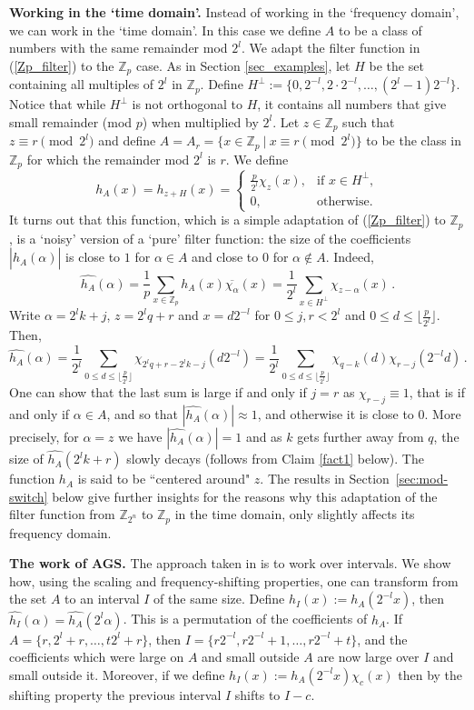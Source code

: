 \documentclass[11pt]{article}
\theoremstyle{definition}
\newcommand{\Z}{\mathbb{Z}}
\begin{document}
\noindent \textbf{Working in the `time domain'.} Instead of working in the `frequency domain', we can work in the `time domain'. In this case we define $A$ to be a class of numbers with the same remainder mod $2^l$. We adapt the filter function in (\ref{Zp_filter}) to the $\Z_p$ case. As in Section \ref{sec_examples}, let $H$ be the set containing all multiples of $2^l$ in $\Z_p$. Define $H^\perp := \{0, 2^{-l}, 2 \cdot 2^{-l}, \dots, (2^l-1) 2^{-l} \}$. Notice that while $H^\perp$ is not orthogonal to $H$, it contains all numbers that give small remainder (mod $p$) when multiplied by $2^l$. Let $z \in \Z_p$ such that $z \equiv r \pmod{2^l}$ and define $A=A_r = \{x \in \Z_p \ | \ x \equiv r \pmod{2^l} \}$ to be the class in $\Z_p$ for which the remainder mod $2^l$ is $r$. We define
\[ h_{A}(x) = h_{z+H}(x) = \begin{cases} \frac{p}{2^l} \chi_{z}(x), & \text{if }x\in H^\perp, \\ 0, &\text{otherwise.}\end{cases} \]
It turns out that this function, which is a simple adaptation of (\ref{Zp_filter}) to $\Z_p$, is a `noisy' version of a `pure' filter function: the size of the coefficients $|\widehat{h_{A}}(\alpha)|$ is close to $1$ for $\alpha \in A$ and close to $0$ for $\alpha \notin A$. Indeed,
\[ \widehat{h_A}(\alpha) = \frac{1}{p} \sum_{x \in \Z_p} h_A(x) \overline{\chi_{\alpha}}(x) = \frac{1}{2^l} \sum_{x \in H^\perp} \chi_{z-\alpha}(x) \, .\]
Write $\alpha = 2^lk+j$, $z = 2^lq+r$ and $x = d 2^{-l}$ for $0 \leq j,r < 2^l$ and $0 \leq d \leq \lfloor \frac{p}{2^l} \rfloor$. Then,
\[ \widehat{h_A}(\alpha) = \frac{1}{2^l} \sum_{0 \leq d \leq \lfloor \frac{p}{2^l} \rfloor} \chi_{2^lq+r-2^lk-j}(d 2^{-l}) = \frac{1}{2^l} \sum_{0 \leq d \leq \lfloor \frac{p}{2^l} \rfloor} \chi_{q-k}(d) \chi_{r-j}(2^{-l}d) \, .\]
One can show that the last sum is large if and only if $j=r$ as $\chi_{r-j} \equiv 1$, that is if and only if $\alpha \in A$, and so that $|\widehat{h_A}(\alpha)| \approx 1$, and otherwise it is close to $0$. More precisely, for $\alpha = z$ we have $|\widehat{h_A}(\alpha)| = 1$ and as $k$ gets further away from $q$, the size of $\widehat{h_A}(2^lk+r)$ slowly decays (follows from Claim \ref{fact1} below). The function $h_A$ is said to be ``centered around" $z$. The results in Section~\ref{sec:mod-switch} below give further insights for the reasons why this adaptation of the filter function from $\Z_{2^n}$ to $\Z_p$ in the time domain, only slightly affects its frequency domain.

\noindent \textbf{The work of AGS.} The approach taken in \cite{AGS,AKA-thesis} is to work over intervals. We show how, using the scaling and frequency-shifting properties, one can transform from the set $A$ to an interval $I$ of the same size. Define $h_I(x) := h_A(2^{-l} x)$, then $\widehat{h_I}(\alpha) = \widehat{h_A}(2^l \alpha)$. This is a permutation of the coefficients of $h_A$. If $A = \{ r, 2^l+r, \ldots, t2^l+r\}$, then $I = \{r2^{-l},r2^{-l}+1,\ldots,r2^{-l}+t\}$, and the coefficients which were large on $A$ and small outside $A$ are now large over $I$ and small outside it. Moreover, if we define $h_I(x) := h_A(2^{-l} x) \chi_c(x)$ then by the shifting property the previous interval $I$ shifts to $I-c$.
\end{document}
